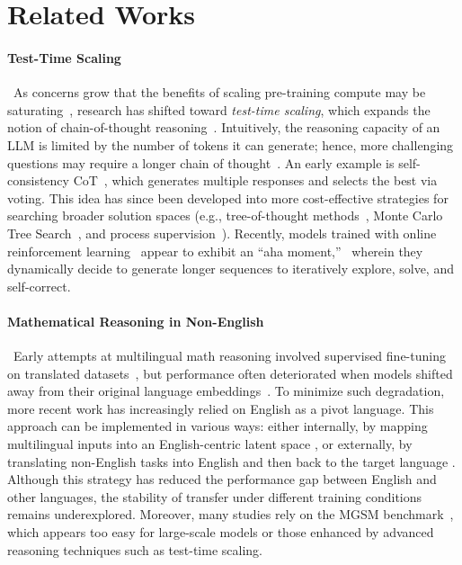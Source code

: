\section{Related Works}
\paragraph{Test-Time Scaling}~As concerns grow that the benefits of scaling pre-training compute may be saturating~\citep{longpre2024consent}, research has shifted toward \emph{test-time scaling}, which expands the notion of chain-of-thought reasoning~\citep{wei2022chain}. Intuitively, the reasoning capacity of an LLM is limited by the number of tokens it can generate; hence, more challenging questions may require a longer chain of thought~\citep{wu2025more}. An early example is self-consistency CoT~\citep{wang2022self}, which generates multiple responses and selects the best via voting. This idea has since been developed into more cost-effective strategies for searching broader solution spaces (e.g., tree-of-thought methods~\citep{yao2024tree}, Monte Carlo Tree Search~\citep{guan2025rstar}, and process supervision~\citep{zhang2025lessons, luo2024improve}). Recently, models trained with online reinforcement learning~\citep{shao2024deepseekmathpushinglimitsmathematical} appear to exhibit an ``aha moment,''~\citep{guo2025deepseek} wherein they dynamically decide to generate longer sequences to iteratively explore, solve, and self-correct. 


\paragraph{Mathematical Reasoning in Non-English}~Early attempts at multilingual math reasoning involved supervised fine-tuning on translated datasets~\citep{chen2023breaking, lai2024mcot}, but performance often deteriorated when models shifted away from their original language embeddings~\citep{hong2024cross}. To minimize such degradation, more recent work has increasingly relied on English as a pivot language. This approach can be implemented in various ways: either internally, by mapping multilingual inputs into an English-centric latent space \citep{yoon2024langbridge, fan2025slam, zhu2024question, she2024mapo}, or externally, by translating non-English tasks into English and then back to the target language \citep{zhang2023plug, ko2025understand}. Although this strategy has reduced the performance gap between English and other languages, the stability of transfer under different training conditions remains underexplored. Moreover, many studies rely on the MGSM benchmark~\citep{shi2022language}, which appears too easy for large-scale models or those enhanced by advanced reasoning techniques such as test-time scaling.